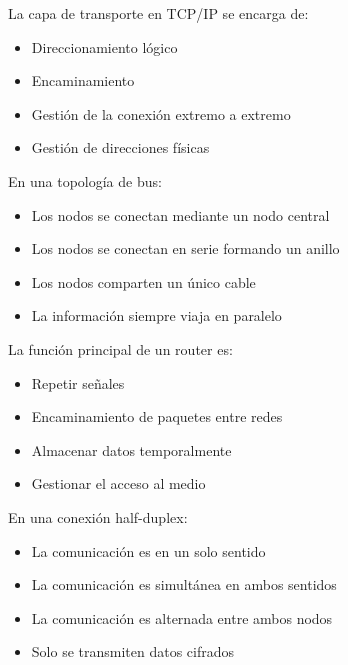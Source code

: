 \documentclass[11pt]{article}
\begin{document}
La capa de transporte en TCP/IP se encarga de:

\begin{itemize}
\item Direccionamiento lógico

\item Encaminamiento

\item Gestión de la conexión extremo a extremo

\item Gestión de direcciones físicas
\end{itemize}

En una topología de bus:

\begin{itemize}
\item Los nodos se conectan mediante un nodo central

\item Los nodos se conectan en serie formando un anillo

\item Los nodos comparten un único cable

\item La información siempre viaja en paralelo
\end{itemize}

La función principal de un router es:

\begin{itemize}
\item Repetir señales

\item Encaminamiento de paquetes entre redes

\item Almacenar datos temporalmente

\item Gestionar el acceso al medio
\end{itemize}

En una conexión half-duplex:

\begin{itemize}
\item La comunicación es en un solo sentido

\item La comunicación es simultánea en ambos sentidos

\item La comunicación es alternada entre ambos nodos

\item Solo se transmiten datos cifrados
\end{itemize}
\end{document}
